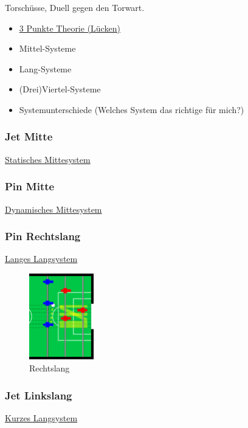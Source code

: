 Torschüsse, Duell gegen den Torwart.

\begin{itemize}
    \item \href{http://ungeblogtkickern.blogspot.de/2015/11/3-punkte-theorie-auf-der-3er-reihe.html}{3 Punkte Theorie (Lücken)}
    \item Mittel-Systeme
    \item Lang-Systeme
    \item (Drei)Viertel-Systeme
    \item Systemunterschiede (Welches System das richtige für mich?)
\end{itemize}

\subsubsection{Jet Mitte}
\href{http://ungeblogtkickern.blogspot.de/2015/06/system-jet-mitte.htmli}{
    Statisches Mittesystem}
\subsubsection{Pin Mitte}
\href{http://ungeblogtkickern.blogspot.de/2015/08/system-pin-mitte.html}{
    Dynamisches Mittesystem}
\subsubsection{Pin Rechtslang}
\href{http://ungeblogtkickern.blogspot.de/2015/07/system-pin-rechtslang.html}{
    Langes Langsystem}

\begin{figure}
    \centering 
        \includegraphics[width=0.25\textwidth]{img/schuss3er_lang.png} 
        \caption{Rechtslang} 
        \label{fig:rechtslang} 
    \end{figure}

\subsubsection{Jet Linkslang}
\href{http://ungeblogtkickern.blogspot.de/2015/07/system-jet-linkslang.html}{
    Kurzes Langsystem}
